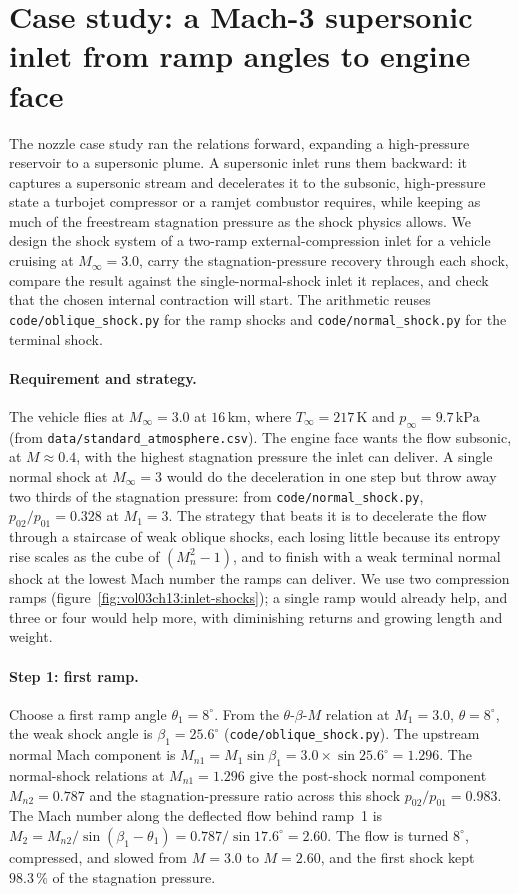 \section{Case study: a Mach-3 supersonic inlet from ramp angles to
engine face}

The nozzle case study ran the relations forward, expanding a
high-pressure reservoir to a supersonic plume. A supersonic inlet runs
them backward: it captures a supersonic stream and decelerates it to
the subsonic, high-pressure state a turbojet compressor or a ramjet
combustor requires, while keeping as much of the freestream stagnation
pressure as the shock physics allows. We design the shock system of a
two-ramp external-compression inlet for a vehicle cruising at
$M_\infty = 3.0$, carry the stagnation-pressure recovery through each
shock, compare the result against the single-normal-shock inlet it
replaces, and check that the chosen internal contraction will start.
The arithmetic reuses \texttt{code/oblique\_shock.py} for the ramp
shocks and \texttt{code/normal\_shock.py} for the terminal shock.

\paragraph{Requirement and strategy.} The vehicle flies at
$M_\infty = 3.0$ at $16\,\si{\kilo\meter}$, where
$T_\infty = 217\,\si{\kelvin}$ and $p_\infty = 9.7\,\text{kPa}$
(from \texttt{data/standard\_atmosphere.csv}). The engine face wants
the flow subsonic, at $M \approx 0.4$, with the highest stagnation
pressure the inlet can deliver. A single normal shock at $M_\infty = 3$
would do the deceleration in one step but throw away two thirds of the
stagnation pressure: from \texttt{code/normal\_shock.py},
$p_{02}/p_{01} = 0.328$ at $M_1 = 3$. The strategy that beats it is to
decelerate the flow through a staircase of weak oblique shocks, each
losing little because its entropy rise scales as the cube of
$(M_n^2 - 1)$, and to finish with a weak terminal normal shock at the
lowest Mach number the ramps can deliver. We use two compression ramps
(figure~\ref{fig:vol03ch13:inlet-shocks}); a single ramp would already
help, and three or four would help more, with diminishing returns and
growing length and weight.

\paragraph{Step 1: first ramp.} Choose a first ramp angle
$\theta_1 = 8^{\circ}$. From the $\theta$-$\beta$-$M$ relation at
$M_1 = 3.0$, $\theta = 8^{\circ}$, the weak shock angle is
$\beta_1 = 25.6^{\circ}$ (\texttt{code/oblique\_shock.py}). The
upstream normal Mach component is
$M_{n1} = M_1 \sin\beta_1 = 3.0 \times \sin 25.6^{\circ} = 1.296$.
The normal-shock relations at $M_{n1} = 1.296$ give the post-shock
normal component $M_{n2} = 0.787$ and the stagnation-pressure ratio
across this shock $p_{02}/p_{01} = 0.983$. The Mach number along the
deflected flow behind ramp~1 is
$M_2 = M_{n2}/\sin(\beta_1 - \theta_1) =
0.787/\sin 17.6^{\circ} = 2.60$. The flow is turned $8^{\circ}$,
compressed, and slowed from $M = 3.0$ to $M = 2.60$, and the first
shock kept $98.3\,\%$ of the stagnation pressure.

